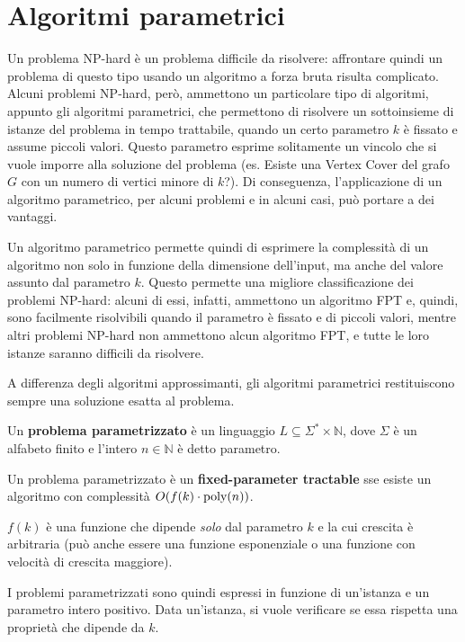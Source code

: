 \section{Algoritmi parametrici}
Un problema NP-hard è un problema difficile da risolvere: affrontare quindi
un problema di questo tipo usando un algoritmo a forza bruta risulta
complicato.
Alcuni problemi NP-hard, però, ammettono un particolare tipo di algoritmi,
appunto gli algoritmi parametrici, che permettono di risolvere un sottoinsieme
di istanze del problema in tempo trattabile, quando un certo parametro $k$
è fissato e assume piccoli valori. Questo parametro esprime solitamente
un vincolo che si vuole imporre alla soluzione del problema (es. Esiste
una Vertex Cover del grafo $G$ con un numero di vertici minore di $k$?).
Di conseguenza, l'applicazione di un algoritmo parametrico, per alcuni
problemi e in alcuni casi, può portare a dei vantaggi.

Un algoritmo parametrico permette quindi di esprimere la complessità di un
algoritmo non solo in funzione della dimensione dell'input, ma anche del
valore assunto dal parametro $k$.
Questo permette una migliore classificazione dei problemi NP-hard: alcuni
di essi, infatti, ammettono un algoritmo FPT e, quindi, sono facilmente
risolvibili quando il parametro è fissato e di piccoli valori, mentre
altri problemi NP-hard non ammettono alcun algoritmo FPT, e tutte le loro
istanze saranno difficili da risolvere.

A differenza degli algoritmi approssimanti, gli algoritmi parametrici
restituiscono sempre una soluzione esatta al problema.

\begin{defn}
    Un \textbf{problema parametrizzato} è un linguaggio
    $L \subseteq \Sigma^* \times \mathbb{N}$, dove $\Sigma$ è un alfabeto
    finito e l'intero $n \in \mathbb{N}$ è detto parametro.
\end{defn}

\begin{defn}
    Un problema parametrizzato è un \textbf{fixed-parameter tractable}
    sse esiste un algoritmo con complessità $O(f(k) \cdot \textnormal{poly}(n))$.

    $f(k)$ è una funzione che dipende \textit{solo} dal parametro $k$ e la
    cui crescita è arbitraria (può anche essere una funzione esponenziale o
    una funzione con velocità di crescita maggiore).
\end{defn}

I problemi parametrizzati sono quindi espressi in funzione di un'istanza e
un parametro intero positivo. Data un'istanza, si vuole verificare se essa
rispetta una proprietà che dipende da $k$.

